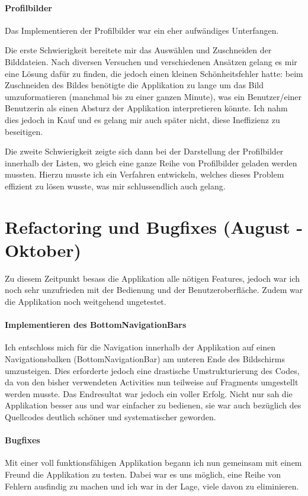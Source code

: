 \documentclass[../main.tex]{subfiles}
\begin{document}
	\paragraph{Profilbilder}
	Das Implementieren der Profilbilder war ein eher aufwändiges Unterfangen.
	
	Die erste Schwierigkeit bereitete mir das Auswählen und Zuschneiden der Bilddateien. Nach diversen Versuchen und verschiedenen Ansätzen gelang es mir eine Lösung dafür zu finden, die jedoch einen kleinen Schönheitsfehler hatte: beim Zuschneiden des Bildes benötigte die Applikation zu lange um das Bild umzuformatieren (manchmal bis zu einer ganzen Minute), was ein Benutzer/einer Benutzerin als einen Absturz der Applikation interpretieren könnte. Ich nahm dies jedoch in Kauf und es gelang mir auch später nicht, diese Ineffizienz zu beseitigen.
	
	Die zweite Schwierigkeit zeigte sich dann bei der Darstellung der Profilbilder innerhalb der Listen, wo gleich eine ganze Reihe von Profilbilder geladen werden mussten. Hierzu musste ich ein Verfahren entwickeln, welches dieses Problem effizient zu lösen wusste, was mir schlussendlich auch gelang.
	
	\section{Refactoring und Bugfixes (August - Oktober)}
	Zu diesem Zeitpunkt besass die Applikation alle nötigen Features, jedoch war ich noch sehr unzufrieden mit der Bedienung und der Benutzeroberfläche. Zudem war die Applikation noch weitgehend ungetestet.
	\paragraph{Implementieren des BottomNavigationBars}
	Ich entschloss mich für die Navigation innerhalb der Applikation auf einen Navigationsbalken (BottomNavigationBar) am unteren Ende des Bildschirms umzusteigen. Dies erforderte jedoch eine drastische Umstrukturierung des Codes, da von den bisher verwendeten Activities nun teilweise auf Fragments umgestellt werden musste. Das Endresultat war jedoch ein voller Erfolg. Nicht nur sah die Applikation besser aus und war einfacher zu bedienen, sie war auch bezüglich des Quellcodes deutlich schöner und systematischer geworden.
	\paragraph{Bugfixes}
	Mit einer voll funktionsfähigen Applikation begann ich nun gemeinsam mit einem Freund die Applikation zu testen. Dabei war es uns möglich, eine Reihe von Fehlern ausfindig zu machen und ich war in der Lage, viele davon zu eliminieren.
\end{document}
